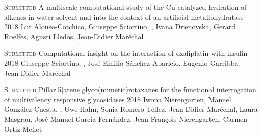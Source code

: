 \begin{cventries}
  \pubentry
    {\scshape{Submitted}} %
    {A multiscale computational study of the Cu-catalyzed hydration of alkenes in water solvent and into the context of an artificial metallohydratase} %
    {2018} %
    {} %
    {Lur Alonso-Cotchico, Giuseppe Sciortino, , Ivana Drienovska, Gerard Roelfes, Agustí Lledós, Jean-Didier Maréchal} %
    {} %
    {} %

  \pubentry
    {\scshape{Submitted}} %
    {Computational insight on the interaction of oxaliplatin with insulin} %
    {2018} %
    {} %
    {Giuseppe Sciortino, , José-Emilio Sánchez-Aparicio, Eugenio Garribba, Jean-Didier Maréchal} %
    {} %
    {} %

  \pubentry
    {\scshape{Submitted}} %
    {Pillar[5]arene glyco(mimetic)rotaxanes for the functional interrogation of multivalency responsive glycosidases} %
    {2018} %
    {} %
    {Iwona Nierengarten, Manuel González-Cuesta, , Uwe Hahn, Sonia Romero-Téllez, Jean-Didier Maréchal, Laura Masgrau, José Manuel Garcia Fernández, Jean-François Nierengarten, Carmen Ortiz Mellet} %
    {} %
    {} %

\end{cventries}


